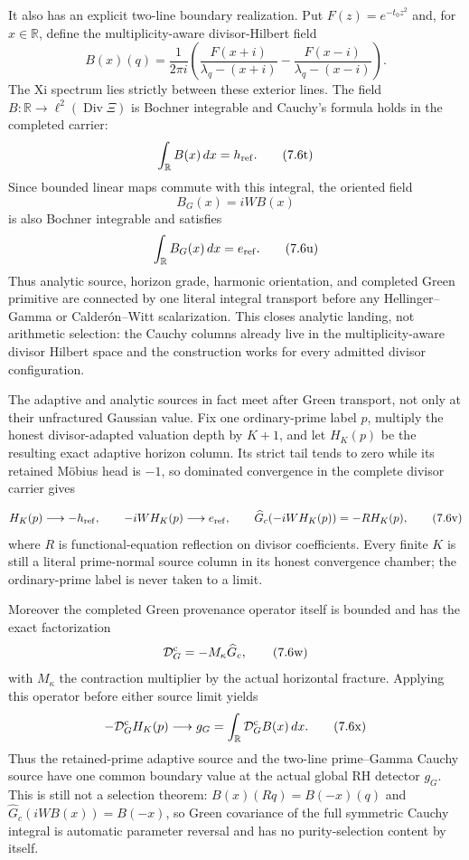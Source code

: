 \documentclass[11pt]{article}
\theoremstyle{definition}
\theoremstyle{remark}
\newcommand{\R}{\mathbb R}
\newcommand{\Div}{\operatorname{Div}}
\begin{document}
It also has an explicit two-line boundary realization.  Put
\(F(z)=e^{-t_0z^2}\) and, for \(x\in\R\), define the multiplicity-aware
divisor-Hilbert field
\[
 B(x)(q)=\frac1{2\pi i}
 \left(
   \frac{F(x+i)}{\lambda_q-(x+i)}
   -\frac{F(x-i)}{\lambda_q-(x-i)}
 \right).
\tag{7.6s}\label{eq:two-line-cauchy-boundary}
\]
The Xi spectrum lies strictly between these exterior lines.  The field
\(B:\R\to\ell^2(\Div\Xi)\) is Bochner integrable and Cauchy's formula holds
in the completed carrier:
\[
                  \int_{\R}B(x)\,dx=h_{\rm ref}.
\tag{7.6t}\label{eq:two-line-cauchy-landing}
\]
Since bounded linear maps commute with this integral, the oriented field
\[
                         B_G(x)=iWB(x)
\]
is also Bochner integrable and satisfies
\[
                  \int_{\R}B_G(x)\,dx=e_{\rm ref}.
\tag{7.6u}\label{eq:oriented-cauchy-landing}
\]
Thus analytic source, horizon grade, harmonic orientation, and completed
Green primitive are connected by one literal integral transport before any
Hellinger--Gamma or Calderón--Witt scalarization.  This closes analytic
landing, not arithmetic selection: the Cauchy columns already live in the
multiplicity-aware divisor Hilbert space and the construction works for
every admitted divisor configuration.

The adaptive and analytic sources in fact meet after Green transport, not
only at their unfractured Gaussian value.  Fix one ordinary-prime label
\(p\), multiply the honest divisor-adapted valuation depth by \(K+1\), and
let \(H_K(p)\) be the resulting exact adaptive horizon column.  Its strict
tail tends to zero while its retained M\"obius head is \(-1\), so dominated
convergence in the complete divisor carrier gives

\[
 H_K(p)\longrightarrow-h_{\rm ref},\qquad
 -iWH_K(p)\longrightarrow e_{\rm ref},\qquad
 \widehat G_c(-iWH_K(p))=-R H_K(p),
\tag{7.6v}\label{eq:adaptive-harmonic-green-boundary}
\]
where \(R\) is functional-equation reflection on divisor coefficients.
Every finite \(K\) is still a literal prime-normal source column in its
honest convergence chamber; the ordinary-prime label is never taken to a
limit.

Moreover the completed Green provenance operator itself is bounded and has
the exact factorization
\[
                  \mathcal D_G^{\rm c}=-M_\kappa\widehat G_c,
\tag{7.6w}\label{eq:completed-green-fracture-factor}
\]
with \(M_\kappa\) the contraction multiplier by the actual horizontal
fracture.  Applying this operator before either source limit yields
\[
 -\mathcal D_G^{\rm c}H_K(p)\longrightarrow g_G
   =\int_\R \mathcal D_G^{\rm c}B(x)\,dx.
\tag{7.6x}\label{eq:common-green-fracture-boundary}
\]
Thus the retained-prime adaptive source and the two-line prime--Gamma
Cauchy source have one common boundary value at the actual global RH
detector \(g_G\).  This is still not a selection theorem:
\(B(x)(Rq)=B(-x)(q)\) and
\(\widehat G_c(iWB(x))=B(-x)\), so Green covariance of the full symmetric
Cauchy integral is automatic parameter reversal and has no purity-selection
content by itself.
\end{document}
